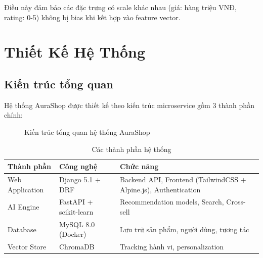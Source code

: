 \documentclass[12pt,a4paper]{report}
\begin{document}
Điều này đảm bảo các đặc trưng có scale khác nhau (giá: hàng triệu VNĐ, rating: 0-5) không bị bias khi kết hợp vào feature vector.

\chapter{Thiết Kế Hệ Thống}

\section{Kiến trúc tổng quan}

Hệ thống AuraShop được thiết kế theo kiến trúc microservice gồm 3 thành phần chính:

\begin{figure}[H]
\centering
{}
\caption{Kiến trúc tổng quan hệ thống AuraShop}
\label{fig:architecture}
\end{figure}

\begin{table}[H]
\centering
\caption{Các thành phần hệ thống}
\label{tab:components}
\begin{tabular}{llp{7cm}}
\toprule
\textbf{Thành phần} & \textbf{Công nghệ} & \textbf{Chức năng} \\
\midrule
Web Application & Django 5.1 + DRF & Backend API, Frontend (TailwindCSS + Alpine.js), Authentication \\
AI Engine & FastAPI + scikit-learn & Recommendation models, Search, Cross-sell \\
Database & MySQL 8.0 (Docker) & Lưu trữ sản phẩm, người dùng, tương tác \\
Vector Store & ChromaDB & Tracking hành vi, personalization \\
\bottomrule
\end{tabular}
\end{table}
\end{document}
